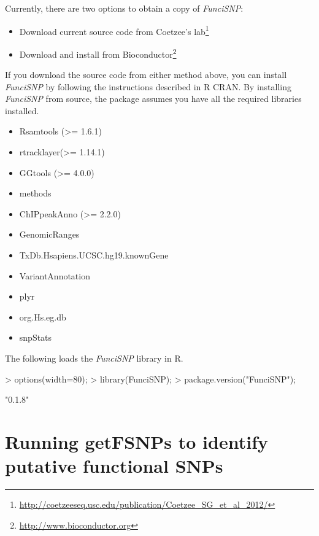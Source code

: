 \documentclass[12pt,fullpage]{article}
\newcommand{\Rpackage}[1]{{\textit{#1}}}
\begin{document}
Currently, there are two options to obtain a copy of \Rpackage{FunciSNP}: 

\begin{itemize}
\item Download current source code from Coetzee's
lab\footnote{\url{http://coetzeeseq.usc.edu/publication/Coetzee_SG_et_al_2012/}}
\item Download and install from
Bioconductor\footnote{\url{http://www.bioconductor.org}}
\end{itemize}

If you download the source code from either method above, you can install
\Rpackage{FunciSNP} by following the instructions described in R CRAN. By
installing \Rpackage{FunciSNP} from source, the package assumes you have all the
required libraries installed.

\begin{itemize}
\item Rsamtools (>= 1.6.1)
\item rtracklayer(>= 1.14.1)
\item GGtools (>= 4.0.0)
\item methods
\item ChIPpeakAnno (>= 2.2.0)
\item GenomicRanges
\item TxDb.Hsapiens.UCSC.hg19.knownGene
\item VariantAnnotation
\item plyr
\item org.Hs.eg.db
\item snpStats
\end{itemize}

The following loads the \Rpackage{FunciSNP} library in R.

\begin{Schunk}
\begin{Sinput}
> options(width=80);
> library(FunciSNP);
> package.version("FunciSNP");
\end{Sinput}
\begin{Soutput}
[1] "0.1.8"
\end{Soutput}
\end{Schunk}

\section{Running getFSNPs to identify putative functional SNPs}
\end{document}
